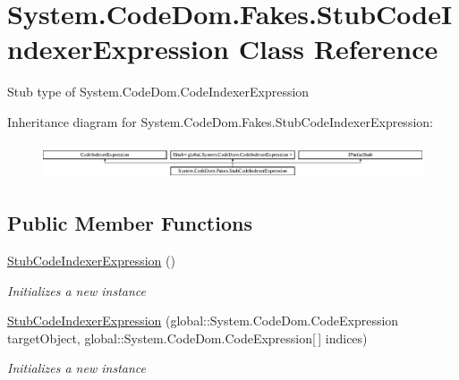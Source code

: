 \hypertarget{class_system_1_1_code_dom_1_1_fakes_1_1_stub_code_indexer_expression}{\section{System.\-Code\-Dom.\-Fakes.\-Stub\-Code\-Indexer\-Expression Class Reference}
\label{class_system_1_1_code_dom_1_1_fakes_1_1_stub_code_indexer_expression}
}


Stub type of System.\-Code\-Dom.\-Code\-Indexer\-Expression 


Inheritance diagram for System.\-Code\-Dom.\-Fakes.\-Stub\-Code\-Indexer\-Expression\-:\begin{figure}[H]
\begin{center}
\leavevmode
\includegraphics[height=1.075889cm]{class_system_1_1_code_dom_1_1_fakes_1_1_stub_code_indexer_expression}
\end{center}
\end{figure}
\subsection*{Public Member Functions}
\begin{DoxyCompactItemize}
\item 
\hyperlink{class_system_1_1_code_dom_1_1_fakes_1_1_stub_code_indexer_expression_a9ff5e97f8541ceb11fed79200f378bec}{Stub\-Code\-Indexer\-Expression} ()
\begin{DoxyCompactList}\small\item\em Initializes a new instance\end{DoxyCompactList}\item 
\hyperlink{class_system_1_1_code_dom_1_1_fakes_1_1_stub_code_indexer_expression_a1ee7e7ecd55727daa2ac5a1b0d212334}{Stub\-Code\-Indexer\-Expression} (global\-::\-System.\-Code\-Dom.\-Code\-Expression target\-Object, global\-::\-System.\-Code\-Dom.\-Code\-Expression\mbox{[}$\,$\mbox{]} indices)
\begin{DoxyCompactList}\small\item\em Initializes a new instance\end{DoxyCompactList}\end{DoxyCompactItemize}
